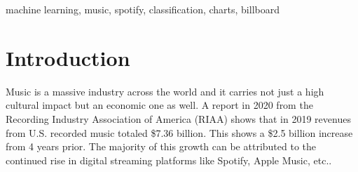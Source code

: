 \documentclass[conference]{IEEEtran}
\begin{document}
\begin{abstract}
\end{abstract}

\begin{IEEEkeywords}
machine learning, music, spotify, classification, charts, billboard
\end{IEEEkeywords}

\section{Introduction}
Music is a massive industry across the world and it carries not just a high cultural impact but an economic one as well. A report in 2020 from the Recording Industry Association of America (RIAA)\cite{b1} shows that in 2019 revenues from U.S. recorded music totaled \$7.36 billion. This shows a \$2.5 billion increase from 4 years prior. The majority of this growth can be attributed to the continued rise in digital streaming platforms like Spotify, Apple Music, etc.\cite{b2}.
\end{document}
